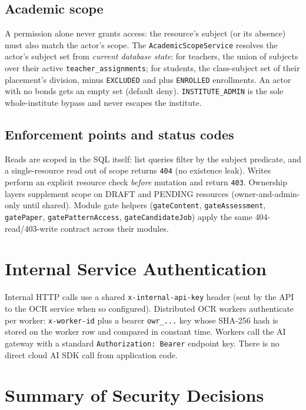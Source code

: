 \subsection{Academic scope}

\noindent A permission alone never grants access: the resource's subject (or
its absence) must also match the actor's scope. The
\texttt{AcademicScopeService} resolves the actor's subject set from \emph{current
database state}: for teachers, the union of subjects over their active
\texttt{teacher\_assignments}; for students, the class-subject set of their
placement's division, minus \texttt{EXCLUDED} and plus \texttt{ENROLLED}
enrollments. An actor with no bonds gets an empty set (default deny).
\texttt{INSTITUTE\_ADMIN} is the sole whole-institute bypass and never escapes
the institute.

\subsection{Enforcement points and status codes}

\noindent Reads are scoped in the SQL itself: list queries filter by the
subject predicate, and a single-resource read out of scope returns
\texttt{404} (no existence leak). Writes perform an explicit resource check
\emph{before} mutation and return \texttt{403}. Ownership layers supplement
scope on DRAFT and PENDING resources (owner-and-admin-only until shared).
Module gate helpers (\texttt{gateContent}, \texttt{gateAssessment},
\texttt{gatePaper}, \texttt{gatePatternAccess}, \texttt{gateCandidateJob})
apply the same 404-read/403-write contract across their modules.

\section{Internal Service Authentication}

\noindent Internal HTTP calls use a shared \texttt{x-internal-api-key} header
(sent by the API to the OCR service when so configured). Distributed OCR
workers authenticate per worker: \texttt{x-worker-id} plus a bearer
\texttt{owr\_...} key whose SHA-256 hash is stored on the worker row and
compared in constant time. Workers call the AI gateway with a standard
\texttt{Authorization: Bearer} endpoint key. There is no direct cloud AI SDK
call from application code.

\section{Summary of Security Decisions}

